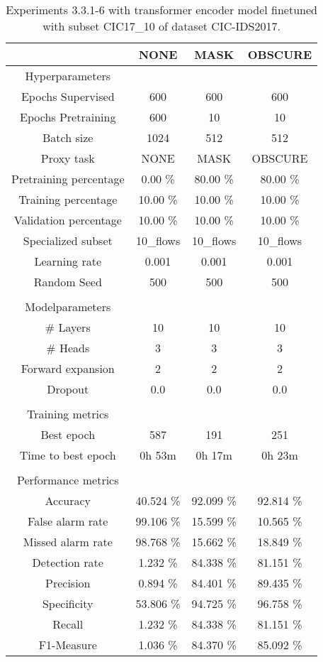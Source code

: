 \begin{table}[htb]
    \centering
    \begin{tabular}{@{}cccc@{}}
        \toprule
         &  NONE &  MASK &  OBSCURE \\
        \midrule
        Hyperparameters &  &  &  \\
        Epochs Supervised &  600 &  600 &  600 \\
        Epochs Pretraining &  600 &  10 &  10 \\
        Batch size &  1024 &  512 &  512 \\
        Proxy task &  NONE &  MASK &  OBSCURE \\
        Pretraining percentage &  0.00 \% &  80.00 \% &  80.00 \% \\
        Training percentage &  10.00 \% &  10.00 \% &  10.00 \% \\
        Validation percentage &  10.00 \% &  10.00 \% &  10.00 \% \\
        Specialized subset &  10\_flows &  10\_flows &  10\_flows \\
        Learning rate &  0.001 &  0.001 &  0.001 \\
        Random Seed &  500 &  500 &  500 \\
         \\
        Modelparameters &  &  &  \\
        \# Layers &  10 &  10 &  10 \\
        \# Heads &  3 &  3 &  3 \\
        Forward expansion &  2 &  2 &  2 \\
        Dropout &  0.0 &  0.0 &  0.0 \\
         \\
        Training metrics &  &  &  \\
        Best epoch &  587 &  191 &  251 \\
        Time to best epoch &  0h 53m &  0h 17m &  0h 23m \\
         \\
        Performance metrics &  &  &  \\
        Accuracy &  40.524 \% &  92.099 \% &  92.814 \% \\
        False alarm rate &  99.106 \% &  15.599 \% &  10.565 \% \\
        Missed alarm rate &  98.768 \% &  15.662 \% &  18.849 \% \\
        Detection rate &  1.232 \% &  84.338 \% &  81.151 \% \\
        Precision &  0.894 \% &  84.401 \% &  89.435 \% \\
        Specificity &  53.806 \% &  94.725 \% &  96.758 \% \\
        Recall &  1.232 \% &  84.338 \% &  81.151 \% \\
        F1-Measure &  1.036 \% &  84.370 \% &  85.092 \% \\
        \bottomrule
    \end{tabular}
    \caption{Experiments 3.3.1-6 with transformer encoder model finetuned with subset CIC17\_10 of dataset CIC-IDS2017.}
    \label{table:results:lstm:stats_flows_subset}
\end{table}